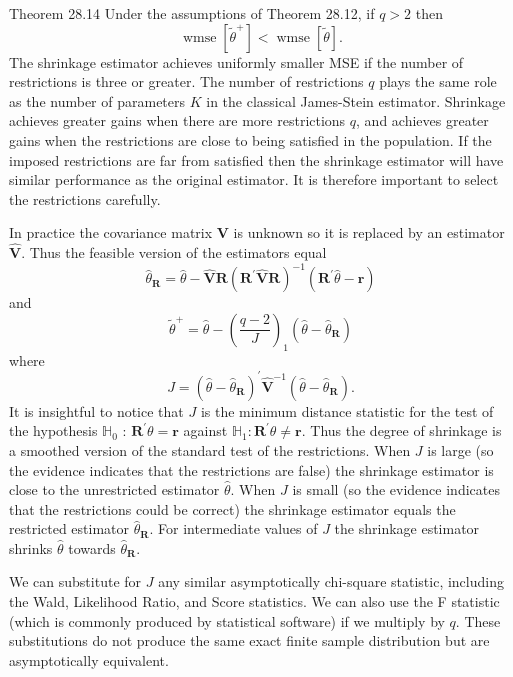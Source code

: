 \documentclass[10pt]{article}
\begin{document}
Theorem 28.14 Under the assumptions of Theorem 28.12, if $q>2$ then
$$
\operatorname{wmse}\left[\widetilde{\theta}^{+}\right]<\operatorname{wmse}[\widetilde{\theta}] .
$$
The shrinkage estimator achieves uniformly smaller MSE if the number of restrictions is three or greater. The number of restrictions $q$ plays the same role as the number of parameters $K$ in the classical James-Stein estimator. Shrinkage achieves greater gains when there are more restrictions $q$, and achieves greater gains when the restrictions are close to being satisfied in the population. If the imposed restrictions are far from satisfied then the shrinkage estimator will have similar performance as the original estimator. It is therefore important to select the restrictions carefully.

In practice the covariance matrix $\boldsymbol{V}$ is unknown so it is replaced by an estimator $\widehat{\boldsymbol{V}}$. Thus the feasible version of the estimators equal
$$
\widehat{\theta}_{\boldsymbol{R}}=\widehat{\theta}-\widehat{\boldsymbol{V}} \boldsymbol{R}\left(\boldsymbol{R}^{\prime} \widehat{\boldsymbol{V}} \boldsymbol{R}\right)^{-1}\left(\boldsymbol{R}^{\prime} \widehat{\theta}-\boldsymbol{r}\right)
$$
and
$$
\widetilde{\theta}^{+}=\widehat{\theta}-\left(\frac{q-2}{J}\right)_{1}\left(\widehat{\theta}-\widehat{\theta}_{\boldsymbol{R}}\right)
$$
where
$$
J=\left(\widehat{\theta}-\widehat{\theta}_{\boldsymbol{R}}\right)^{\prime} \widehat{\boldsymbol{V}}^{-1}\left(\widehat{\theta}-\widehat{\theta}_{\boldsymbol{R}}\right) .
$$
It is insightful to notice that $J$ is the minimum distance statistic for the test of the hypothesis $\mathbb{H}_{0}$ : $\boldsymbol{R}^{\prime} \theta=\boldsymbol{r}$ against $\mathbb{H}_{1}: \boldsymbol{R}^{\prime} \theta \neq \boldsymbol{r}$. Thus the degree of shrinkage is a smoothed version of the standard test of the restrictions. When $J$ is large (so the evidence indicates that the restrictions are false) the shrinkage estimator is close to the unrestricted estimator $\widehat{\theta}$. When $J$ is small (so the evidence indicates that the restrictions could be correct) the shrinkage estimator equals the restricted estimator $\widehat{\theta}_{\boldsymbol{R}}$. For intermediate values of $J$ the shrinkage estimator shrinks $\widehat{\theta}$ towards $\widehat{\theta}_{\boldsymbol{R}}$.

We can substitute for $J$ any similar asymptotically chi-square statistic, including the Wald, Likelihood Ratio, and Score statistics. We can also use the F statistic (which is commonly produced by statistical software) if we multiply by $q$. These substitutions do not produce the same exact finite sample distribution but are asymptotically equivalent.
\end{document}
